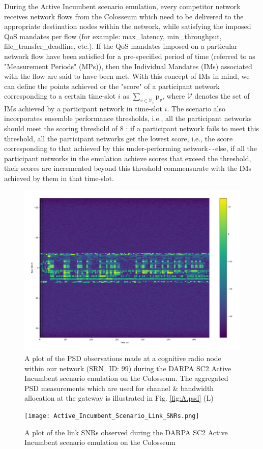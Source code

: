 \documentclass[12pt, draftcls, onecolumn]{IEEEtran}
\begin{document}
During the Active Incumbent scenario emulation, every competitor network receives network flows from the Colosseum which need to be delivered to the appropriate destination nodes within the network, while satisfying the imposed QoS mandates per flow (for example: max\_latency, min\_throughput, file\_transfer\_deadline, etc.). If the QoS mandates imposed on a particular network flow have been satisfied for a pre-specified period of time (referred to as "Measurement Periods" (MPs)), then the Individual Mandates (IMs) associated with the flow are said to have been met. With this concept of IMs in mind, we can define the points achieved or the "score" of a participant network corresponding to a certain time-slot $i$ as $\sum_{v{\in}\mathcal{V}_{i}} \text{p}_{v}$, where $\mathcal{V}$ denotes the set of IMs achieved by a participant network in time-slot $i$. The scenario also incorporates ensemble performance thresholds, i.e., all the participant networks should meet the scoring threshold of $8$ \cite{DARPA:ActiveIncumbent}: if a participant network fails to meet this threshold, all the participant networks get the lowest score, i.e., the score corresponding to that achieved by this under-performing network\texttt{-{}-}else, if all the participant networks in the emulation achieve scores that exceed the threshold, their scores are incremented beyond this threshold commensurate with the IMs achieved by them in that time-slot.
\begin{figure} [htb]
    \centerline{
    \includegraphics[width = 0.8\linewidth]{PSD_Observations_Active_Incumbent.png}}
    \caption{A plot of the PSD observations made at a cognitive radio node within our network (SRN\_ID: $99$) during the DARPA SC2 Active Incumbent scenario emulation on the Colosseum. The aggregated PSD measurements which are used for channel \& bandwidth allocation at the gateway is illustrated in Fig. \ref{fig:A.psd} (L)}
    \label{fig: Y. 3}
\end{figure}
\begin{figure} [htb]
    \centerline{
    \texttt{[image: Active\_Incumbent\_Scenario\_Link\_SNRs.png]}}
    \caption{A plot of the link SNRs observed during the DARPA SC2 Active Incumbent scenario emulation on the Colosseum}
    \label{fig: Y. 2}
\end{figure}
\end{document}
